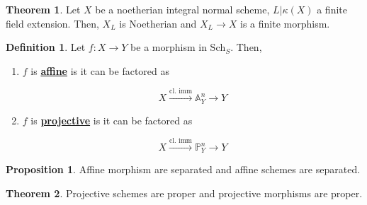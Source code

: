 \documentclass{article}
\theoremstyle{definition}
\newtheorem{theorem}{Theorem}[section]
\theoremstyle{definition}
\newtheorem{definition}{Definition}[theorem]
\theoremstyle{definition}
\theoremstyle{definition}
\newtheorem{proposition}{Proposition}[theorem]
\theoremstyle{definition}
\theoremstyle{definition}
\theoremstyle{definition}
\begin{document}
\begin{tcolorbox}[colback=red!5!white,colframe=red!30!white]
\begin{theorem}
Let $X$ be a noetherian integral normal scheme, $L|\kappa(X)$ a finite field extension. Then, $X_L$ is Noetherian and $X_L\to X$ is a finite morphism. 
\end{theorem}
\end{tcolorbox}


\begin{tcolorbox}[colback=purple!5!white,colframe=purple!75!black]
\begin{definition}
Let $f: X\to Y$ be a morphism in $\textrm{Sch}_S$. Then,
\begin{enumerate}
    \item $f$ is \underline{\textbf{affine}} is it can be factored as 
    
    \[X\xrightarrow{\textrm{cl. imm}} \mathbb{A}^n_Y\to Y\]
    \item $f$ is \underline{\textbf{projective}} is it can be factored as 
    
    \[X\xrightarrow{\textrm{cl. imm}} \mathbb{P}^n_Y\to Y\]
    
\end{enumerate}
\end{definition}
\end{tcolorbox}


\begin{tcolorbox}[colback=blue!5!white,colframe=blue!30!white]
\begin{proposition}
Affine morphism are separated and affine schemes are separated. 
\end{proposition}
\end{tcolorbox}


\begin{tcolorbox}[colback=red!5!white,colframe=red!30!white]
\begin{theorem}
Projective schemes are proper and projective morphisms are proper. 
\end{theorem}
\end{tcolorbox}
\end{document}
